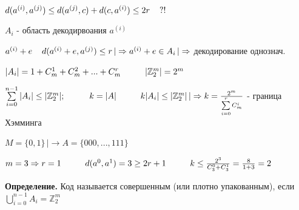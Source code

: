 \documentclass[12pt]{article}
\begin{document}
$ $\par
$d(a^{(i)},a^{(j)}) \leq d(a^{(j)},c) + d(c,a^{(i)}) \leq 2r \hspace{4 mm} ?!$\par
$A_i$ - область декодирвоания $a^{(i)}$\par
$a^{(i)}+e \hspace{4 mm} d(a^{(i)}+e, a^{(j)}) \leq r \, | \Rightarrow a^{(i)}+e \in A_i \, | \Rightarrow$ декодирование однознач.\par
$|A_i| = 1 + C_m^1 + C_m^2 + ... + C_m^r \hspace{1 cm} |\mathbb{Z}_2^m| = 2^m$\par
$\sum\limits_{i=0}^{n-1}|A_i| \leq |\mathbb{Z}_2^m|; \hspace{1 cm} k = |A| \hspace{1 cm} k|A_i| \leq |\mathbb{Z}_2^m| \, |\Rightarrow k = \frac{2^m}{\sum\limits_{i=0}^{r} C_m^i}$ - граница Хэмминга\par
$M = \{ 0, 1 \} \, |\to A = \{ 000,...,111 \}$\par
$m = 3 \Rightarrow r = 1 \hspace{1 cm} d(a^0, a^1)=3 \geq 2r+1 \hspace{1 cm} k \leq \frac{2^3}{C_3^0 + C_3^1} = \frac{8}{1+3} = 2$\par
\textbf{Определение.} Код называется совершенным (или плотно упакованным), если $\bigcup\limits_{i=0}^{n-1}A_i = \mathbb{Z}_2^m$\par
\end{document}

